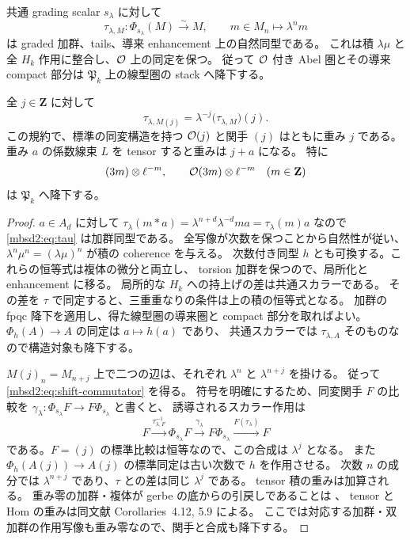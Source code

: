\begin{proposition}
\label{mbsd2:prop:scalar-weight}
共通 grading scalar $s_\lambda$ に対して
\begin{equation}\label{mbsd2:eq:tau}
 \tau_{\lambda,M}:\Phi_{s_\lambda}(M)\xrightarrow{\sim}M,
 \qquad m\in M_n\longmapsto\lambda^n m
\end{equation}
は graded 加群、tails、導来 enhancement 上の自然同型である。
これは積 $\lambda\mu$ と全 $H_k$ 作用に整合し、$\mathcal O$ 上の同定を保つ。
従って $\mathcal O$ 付き Abel 圏とその導来 compact 部分は
$\mathfrak P_k$ 上の線型圏の stack へ降下する。

全 $j\in\mathbf Z$ に対して
\begin{equation}\label{mbsd2:eq:shift-commutator}
 \tau_{\lambda,M(j)}
   =\lambda^{-j}\bigl(\tau_{\lambda,M}\bigr)(j).
\end{equation}
この規約で、標準の同変構造を持つ $\mathcal O(j)$ と関手 $(j)$ はともに重み $j$ である。
重み $a$ の係数線束 $L$ を tensor すると重みは $j+a$ になる。
特に
\begin{equation}\label{mbsd2:eq:corrected-shift}
 (3m)\otimes\ell^{-m},\qquad
 \mathcal O(3m)\otimes\ell^{-m}\quad(m\in\mathbf Z)
\end{equation}
は $\mathfrak P_k$ へ降下する。
\end{proposition}

\begin{proof}
$a\in A_d$ に対して
$\tau_\lambda(m*a)=\lambda^{n+d}\lambda^{-d}ma
=\tau_\lambda(m)a$ なので \eqref{mbsd2:eq:tau} は加群同型である。
全写像が次数を保つことから自然性が従い、
$\lambda^n\mu^n=(\lambda\mu)^n$ が積の coherence を与える。
次数付き同型 $h$ とも可換する。これらの恒等式は複体の微分と両立し、
torsion 加群を保つので、局所化と enhancement に移る。
局所的な $H_k$ への持上げの差は共通スカラーである。
その差を $\tau$ で同定すると、三重重なりの条件は上の積の恒等式となる。
加群の fpqc 降下を適用し、得た線型圏の導来圏と compact 部分を取ればよい。
$\Phi_h(A)\to A$ の同定は $a\mapsto h(a)$ であり、
共通スカラーでは $\tau_{\lambda,A}$ そのものなので構造対象も降下する。

$M(j)_n=M_{n+j}$ 上で二つの辺は、それぞれ $\lambda^n$ と $\lambda^{n+j}$ を掛ける。
従って \eqref{mbsd2:eq:shift-commutator} を得る。
符号を明確にするため、同変関手 $F$ の比較を
$\gamma_\lambda:\Phi_{s_\lambda}F\to F\Phi_{s_\lambda}$ と書くと、
誘導されるスカラー作用は
\begin{equation}\label{mbsd2:eq:functor-weight}
 F\xrightarrow{\tau_{\lambda,F}^{-1}}\Phi_{s_\lambda}F
 \xrightarrow{\gamma_\lambda}F\Phi_{s_\lambda}
 \xrightarrow{F(\tau_\lambda)}F
\end{equation}
である。$F=(j)$ の標準比較は恒等なので、この合成は $\lambda^j$ となる。
また $\Phi_h(A(j))\to A(j)$ の標準同定は古い次数で $h$ を作用させる。
次数 $n$ の成分では $\lambda^{n+j}$ であり、$\tau$ との差は同じ $\lambda^j$ である。
tensor 積の重みは加算される。
重み零の加群・複体が gerbe の底からの引戻しであることは
\cite[Propositions~4.10, 5.7]{NFMBerghSchnurer}、
tensor と Hom の重みは同文献 Corollaries~4.12, 5.9 による。
ここでは対応する加群・双加群の作用写像も重み零なので、関手と合成も降下する。
\end{proof}

